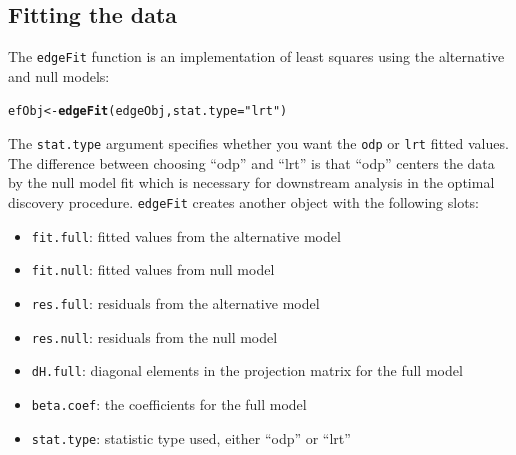 \documentclass{article}\usepackage[]{graphicx}\usepackage[]{color}
\makeatletter
\newcommand{\hlstr}[1]{\textcolor[rgb]{0.192,0.494,0.8}{#1}}%
\newcommand{\hlstd}[1]{\textcolor[rgb]{0.345,0.345,0.345}{#1}}%
\newcommand{\hlkwb}[1]{\textcolor[rgb]{0.69,0.353,0.396}{#1}}%
\newcommand{\hlkwc}[1]{\textcolor[rgb]{0.333,0.667,0.333}{#1}}%
\newcommand{\hlkwd}[1]{\textcolor[rgb]{0.737,0.353,0.396}{\textbf{#1}}}%
\newenvironment{kframe}{%
 \def\at@end@of@kframe{}%
 \ifinner\ifhmode%
  \def\at@end@of@kframe{\end{minipage}}%
  \begin{minipage}{\columnwidth}%
 \fi\fi%
 \def\FrameCommand##1{\hskip\@totalleftmargin \hskip-\fboxsep
 \colorbox{shadecolor}{##1}\hskip-\fboxsep
     \hskip-\linewidth \hskip-\@totalleftmargin \hskip\columnwidth}%
 \MakeFramed {\advance\hsize-\width
   \@totalleftmargin\z@ \linewidth\hsize
   \@setminipage}}%
 {\par\unskip\endMakeFramed%
 \at@end@of@kframe}
\newenvironment{knitrout}{}{} %
\makeatother
\begin{document}
\subsection{Fitting the data}
The {\tt edgeFit} function is an implementation of least squares using the alternative and null models:
\begin{knitrout}
\color{fgcolor}\begin{kframe}
\begin{alltt}
\hlstd{efObj} \hlkwb{<-} \hlkwd{edgeFit}\hlstd{(edgeObj,} \hlkwc{stat.type} \hlstd{=} \hlstr{"lrt"}\hlstd{)}
\end{alltt}
\end{kframe}
\end{knitrout}
The {\tt stat.type} argument specifies whether you want the {\tt odp} or {\tt lrt} fitted values. The difference between choosing ``odp'' and ``lrt'' is that ``odp'' centers the data by the null model fit which is necessary for downstream analysis in the optimal discovery procedure. {\tt edgeFit} creates another object with the following slots:
\begin{itemize}
\item {\tt fit.full}: fitted values from the alternative model
\item {\tt fit.null}: fitted values from null model
\item {\tt res.full}: residuals from the alternative model
\item {\tt res.null}: residuals from the null model
\item {\tt dH.full}: diagonal elements in the projection matrix for the full model
\item {\tt beta.coef}: the coefficients for the full model
\item {\tt stat.type}: statistic type used, either ``odp'' or ``lrt''
\end{itemize}
\end{document}
